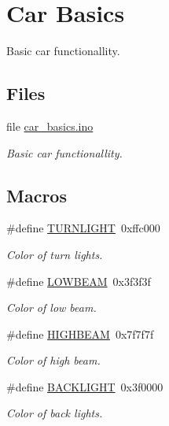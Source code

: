 \hypertarget{group__car}{}\section{Car Basics}
\label{group__car}


Basic car functionallity.  


\subsection*{Files}
\begin{DoxyCompactItemize}
\item 
file \hyperlink{car__basics_8ino}{car\+\_\+basics.\+ino}
\begin{DoxyCompactList}\small\item\em Basic car functionallity. \end{DoxyCompactList}\end{DoxyCompactItemize}
\subsection*{Macros}
\begin{DoxyCompactItemize}
\item 
\#define \hyperlink{group__car_ga6670c8646da7675376960bb5773199fd}{T\+U\+R\+N\+L\+I\+G\+HT}~0xffc000
\begin{DoxyCompactList}\small\item\em Color of turn lights. \end{DoxyCompactList}\item 
\#define \hyperlink{group__car_ga61bb8d5dab460079c1b621b2d8a4bd9c}{L\+O\+W\+B\+E\+AM}~0x3f3f3f
\begin{DoxyCompactList}\small\item\em Color of low beam. \end{DoxyCompactList}\item 
\#define \hyperlink{group__car_ga3f561f12573270e4b5329bc5930ad20f}{H\+I\+G\+H\+B\+E\+AM}~0x7f7f7f
\begin{DoxyCompactList}\small\item\em Color of high beam. \end{DoxyCompactList}\item 
\#define \hyperlink{group__car_gae97ccf06dd29b2a0500f378068b678e2}{B\+A\+C\+K\+L\+I\+G\+HT}~0x3f0000
\begin{DoxyCompactList}\small\item\em Color of back lights. \end{DoxyCompactList}\end{DoxyCompactItemize}
